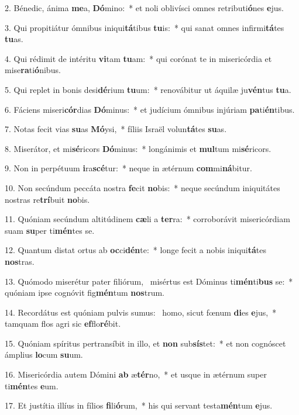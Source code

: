 2. Bénedic, ánima \textbf{me}a, \textbf{Dó}mino:~*  et noli oblivísci omnes retributi\textbf{ó}nes \textbf{e}jus.\

3. Qui propitiátur ómnibus iniqui\textbf{tá}tibus \textbf{tu}is:~*  qui sanat omnes infirmi\textbf{tá}tes \textbf{tu}as.\

4. Qui rédimit de intéritu \textbf{vi}tam \textbf{tu}am:~*  qui corónat te in misericórdia et mise\textbf{ra}ti\textbf{ó}nibus.\

5. Qui replet in bonis desi\textbf{dé}rium \textbf{tu}um:~*  renovábitur ut áquilæ ju\textbf{vén}tus \textbf{tu}a.\

6. Fáciens miseri\textbf{cór}dias \textbf{Dó}minus:~*  et judícium ómnibus injúriam \textbf{pa}ti\textbf{én}tibus.\

7. Notas fecit vias \textbf{su}as \textbf{Mó}ysi,~*  fíliis Israël volun\textbf{tá}tes \textbf{su}as.\

8. Miserátor, et mi\textbf{sé}ricors \textbf{Dó}minus:~*  longánimis et \textbf{mul}tum mi\textbf{sé}ricors.\

9. Non in perpétuum \textbf{i}ra\textbf{scé}tur:~*  neque in ætérnum \textbf{com}mi\textbf{ná}bitur.\

10. Non secúndum peccáta nostra \textbf{fe}cit \textbf{no}bis:~*  neque secúndum iniquitátes nostras re\textbf{trí}buit \textbf{no}bis.\

11. Quóniam secúndum altitúdinem \textbf{cæ}li a \textbf{ter}ra:~*  corroborávit misericórdiam suam \textbf{su}per ti\textbf{mén}tes se.\

12. Quantum distat ortus ab \textbf{oc}ci\textbf{dén}te:~*  longe fecit a nobis iniqui\textbf{tá}tes \textbf{nos}tras.\

13. Quómodo miserétur pater filiórum, \dag\  misértus est Dóminus ti\textbf{mén}ti\textbf{bus} se:~*  quóniam ipse cognóvit fig\textbf{mén}tum \textbf{nos}trum.\

14. Recordátus est quóniam pulvis sumus: \dag\  homo, sicut fœnum \textbf{di}es \textbf{e}jus,~*  tamquam flos agri sic \textbf{ef}flo\textbf{ré}bit.\

15. Quóniam spíritus pertransíbit in illo, et \textbf{non} sub\textbf{sís}tet:~*  et non cognóscet ámplius \textbf{lo}cum \textbf{su}um.\

16. Misericórdia autem Dómini \textbf{ab} æ\textbf{tér}no,~*  et usque in ætérnum super ti\textbf{mén}tes \textbf{e}um.\

17. Et justítia illíus in fílios \textbf{fi}li\textbf{ó}rum,~*  his qui servant testa\textbf{mén}tum \textbf{e}jus.\

